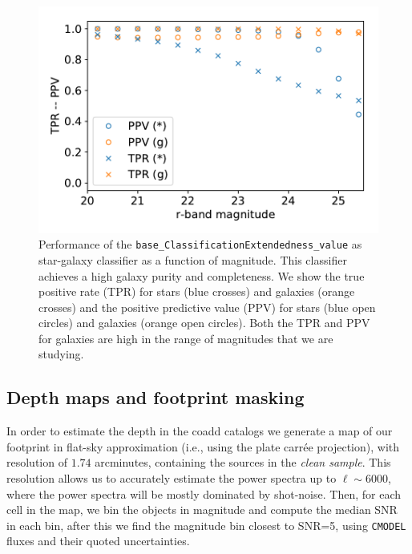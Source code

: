 \documentclass[a4paper,fleqn,usenatbib]{mnras}
\begin{document}
\begin{figure}
\centering
\includegraphics[width=0.9\columnwidth]{stellar_contamination_v2}
\caption{Performance of the \texttt{base\_ClassificationExtendedness\_value} as star-galaxy classifier as a function of magnitude. This classifier achieves a high galaxy purity and completeness. We show the true positive rate (TPR) for stars (blue crosses) and galaxies (orange crosses) and the positive predictive value (PPV) for stars (blue open circles) and galaxies (orange open circles). Both the TPR and PPV for galaxies are high in the range of magnitudes that we are studying.}
\label{fig:star_galaxy_separation}
\end{figure}
\subsection{Depth maps and footprint masking}
\label{sec:masking}

In order to estimate the depth in the coadd catalogs we generate a map of our footprint in flat-sky approximation (i.e., using the plate carr\'{e}e projection), with resolution of $1.74$ arcminutes, containing the sources in the \textit{clean sample}. This resolution allows us to accurately estimate the power spectra up to $\ell \sim 6000$, where the power spectra will be mostly dominated by shot-noise. Then, for each cell in the map, we bin the objects in magnitude and compute  the median SNR in each bin, after this we find the magnitude bin closest to SNR=5, using \texttt{CMODEL} fluxes and their quoted uncertainties.
\end{document}
